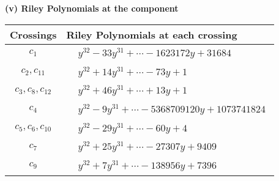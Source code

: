\documentclass[1p]{elsarticle_modified}
\theoremstyle{definition}
\begin{document}
\newpage\renewcommand{\arraystretch}{1}
\flushleft \textbf{(v) Riley Polynomials at the component}\newline \\
\begin{tabular}{m{50pt}|m{274pt}}
Crossings & \hspace{64pt}Riley Polynomials at each crossing \\
\hline $$\begin{aligned}c_{1}\end{aligned}$$&$\begin{aligned}
&y^{32}-33 y^{31}+\cdots-1623172 y+31684
\end{aligned}$\\
\hline $$\begin{aligned}c_{2},c_{11}\end{aligned}$$&$\begin{aligned}
&y^{32}+14 y^{31}+\cdots-73 y+1
\end{aligned}$\\
\hline $$\begin{aligned}c_{3},c_{8},c_{12}\end{aligned}$$&$\begin{aligned}
&y^{32}+46 y^{31}+\cdots+13 y+1
\end{aligned}$\\
\hline $$\begin{aligned}c_{4}\end{aligned}$$&$\begin{aligned}
&y^{32}-9 y^{31}+\cdots-5368709120 y+1073741824
\end{aligned}$\\
\hline $$\begin{aligned}c_{5},c_{6},c_{10}\end{aligned}$$&$\begin{aligned}
&y^{32}-29 y^{31}+\cdots-60 y+4
\end{aligned}$\\
\hline $$\begin{aligned}c_{7}\end{aligned}$$&$\begin{aligned}
&y^{32}+25 y^{31}+\cdots-27307 y+9409
\end{aligned}$\\
\hline $$\begin{aligned}c_{9}\end{aligned}$$&$\begin{aligned}
&y^{32}+7 y^{31}+\cdots-138956 y+7396
\end{aligned}$\\
\hline
\end{tabular}\\~\\
\end{document}
